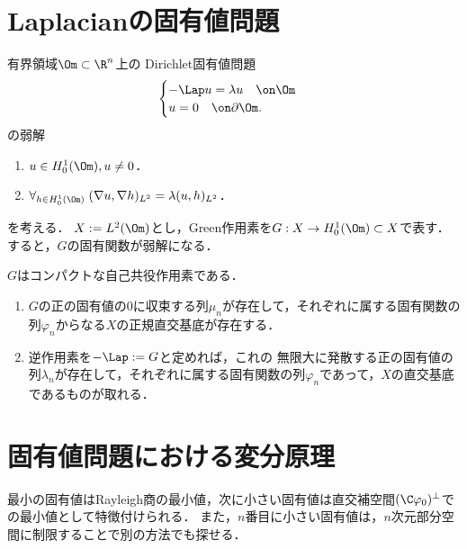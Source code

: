 \documentclass[uplatex,dvipdfmx]{jsreport}
\begin{document}
\section{Laplacianの固有値問題}

\begin{problem}
    有界領域$\Om\subset\R^n$上の
    Dirichlet固有値問題
    \[\begin{cases}
        -\Lap u=\lambda u\quad\on\Om\\
        u=0\quad\on\partial\Om.
    \end{cases}\]
    の弱解
    \begin{enumerate}
        \item $u\in H^1_0(\Om),u\ne0$．
        \item $\forall_{h\in H^1_0(\Om)}\;(\nabla u,\nabla h)_{L^2}=\lambda(u,h)_{L^2}$．
    \end{enumerate}
    を考える．
    $X:=L^2(\Om)$とし，Green作用素を$G:X\to H^1_0(\Om)\subset X$で表す．
    すると，$G$の固有関数が弱解になる．
\end{problem}

\begin{proposition}
    $G$はコンパクトな自己共役作用素である．
\end{proposition}

\begin{theorem}\mbox{}
    \begin{enumerate}
        \item $G$の正の固有値の$0$に収束する列$\mu_n$が存在して，それぞれに属する固有関数の列$\varphi_n$からなる$X$の正規直交基底が存在する．
        \item 逆作用素を$-\Lap:=G$と定めれば，これの
        無限大に発散する正の固有値の列$\lambda_n$が存在して，それぞれに属する固有関数の列$\varphi_n$であって，$X$の直交基底であるものが取れる．
    \end{enumerate}
\end{theorem}

\section{固有値問題における変分原理}

\begin{tcolorbox}[colframe=ForestGreen, colback=ForestGreen!10!white,breakable,colbacktitle=ForestGreen!40!white,coltitle=black,fonttitle=\bfseries\sffamily,
title=]
    最小の固有値はRayleigh商の最小値，次に小さい固有値は直交補空間$(\C\varphi_0)^\perp$での最小値として特徴付けられる．
    また，$n$番目に小さい固有値は，$n$次元部分空間に制限することで別の方法でも探せる．
\end{tcolorbox}
\end{document}
